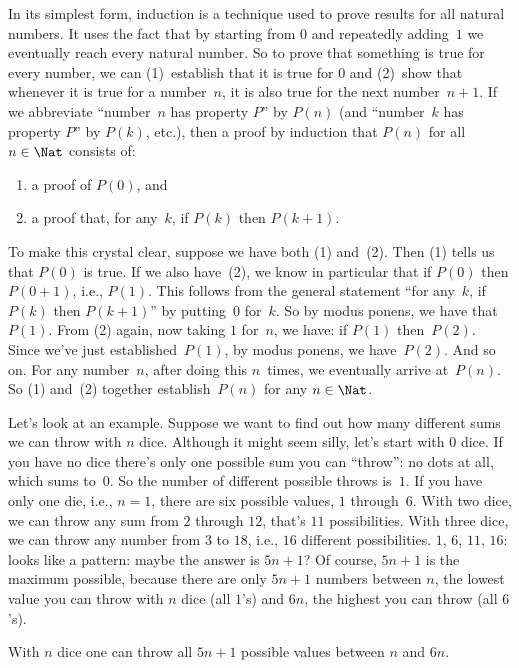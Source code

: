 \documentclass[../../../include/open-logic-section]{subfiles}
\begin{document}

In its simplest form, induction is a technique used to prove results
for all natural numbers. It uses the fact that by starting from $0$
and repeatedly adding~$1$ we eventually reach every natural number. So
to prove that something is true for every number, we can (1)~establish
that it is true for $0$ and (2)~show that whenever it is true for a
number~$n$, it is also true for the next number~$n+1$.  If we
abbreviate ``number~$n$ has property $P$'' by $P(n)$ (and ``number~$k$
has property $P$'' by $P(k)$, etc.), then a proof by induction that
$P(n)$ for all $n \in \Nat$ consists of:
\begin{enumerate}
\item a proof of $P(0)$, and
\item a proof that, for any~$k$, if $P(k)$ then $P(k+1)$.
\end{enumerate}
To make this crystal clear, suppose we have both (1) and~(2).  Then
(1) tells us that $P(0)$ is true.  If we also have~(2), we know in
particular that if $P(0)$ then $P(0+1)$, i.e., $P(1)$. This follows
from the general statement ``for any~$k$, if $P(k)$ then $P(k+1)$'' by
putting~$0$ for~$k$. So by modus ponens, we have that~$P(1)$. From (2)
again, now taking $1$ for~$n$, we have: if $P(1)$ then~$P(2)$. Since
we've just established~$P(1)$, by modus ponens, we have~$P(2)$. And so
on.  For any number~$n$, after doing this $n$~times, we eventually
arrive at~$P(n)$.  So (1) and~(2) together establish~$P(n)$ for any $n
\in \Nat$.

Let's look at an example.  Suppose we want to find out how many
different sums we can throw with $n$ dice.  Although it might seem
silly, let's start with $0$ dice.  If you have no dice there's only one
possible sum you can ``throw'': no dots at all, which sums to~$0$. So
the number of different possible throws is~$1$. If you have only one
die, i.e., $n=1$, there are six possible values, $1$ through~$6$. With
two dice, we can throw any sum from $2$ through $12$, that's $11$
possibilities.  With three dice, we can throw any number from $3$ to
$18$, i.e., $16$ different possibilities.  $1$, $6$, $11$, $16$: looks
like a pattern: maybe the answer is $5n+1$?  Of course, $5n+1$ is the
maximum possible, because there are only $5n+1$ numbers between $n$,
the lowest value you can throw with $n$ dice (all $1$'s) and $6n$, the
highest you can throw (all $6$'s).

\begin{thm}
  With $n$ dice one can throw all $5n+1$ possible values between $n$
  and $6n$.
\end{thm}
\end{document}

